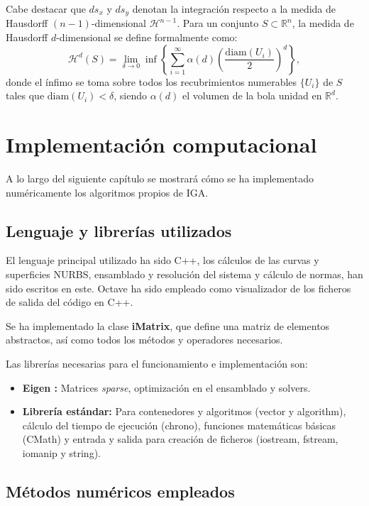 \documentclass[11pt]{book}
\theoremstyle{plain} %
\theoremstyle{definition} %
\theoremstyle{definition} %
\begin{document}
Cabe destacar que $ds_x$ y $ds_y$ denotan la integración respecto a la medida de Hausdorff $(n-1)$-dimensional $\mathcal{H}^{n-1}$. Para un conjunto $S \subset \mathbb{R}^n$, la medida de Hausdorff $d$-dimensional se define formalmente como:
\begin{equation*}
    \mathcal{H}^d(S) = \lim_{\delta \to 0} \inf \left\{ \sum_{i=1}^\infty \alpha(d) \left(\frac{\text{diam}(U_i)}{2}\right)^d \right\},
\end{equation*}
donde el ínfimo se toma sobre todos los recubrimientos numerables $\{U_i\}$ de $S$ tales que $\text{diam}(U_i) < \delta$, siendo $\alpha(d)$ el volumen de la bola unidad en $\mathbb{R}^d$.


\section{Implementación computacional}\label{Anex:comp}

A lo largo del siguiente capítulo se mostrará cómo se ha implementado numéricamente los algoritmos propios de IGA.

\subsection{Lenguaje y librerías utilizados}

El lenguaje principal utilizado ha sido C++, los cálculos de las curvas y superficies NURBS, ensamblado y resolución del sistema y cálculo de normas, han sido escritos en este. Octave ha sido empleado como visualizador de los ficheros de salida del código en C++.

Se ha implementado la clase \textbf{iMatrix}, que define una matriz de elementos abstractos, así como todos los métodos y operadores necesarios.

Las librerías necesarias para el funcionamiento e implementación son:
\begin{itemize}
    \item \textbf{Eigen \cite{guennebaud_eigen_2010}:} Matrices \textit{sparse}, optimización en el ensamblado y solvers.
    \item \textbf{Librería estándar:} Para contenedores y algoritmos (vector y algorithm), cálculo del tiempo de ejecución (chrono), funciones matemáticas básicas (CMath) y entrada y salida para creación de ficheros (iostream, fstream, iomanip y string).
\end{itemize}

\subsection{Métodos numéricos empleados}
\end{document}
